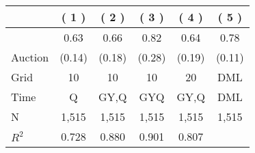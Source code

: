 
\begin{tabular}{lccccc}
\toprule
 & ( 1 ) & ( 2 ) & ( 3 ) & ( 4 ) & ( 5 )\\
\midrule
 & 0.63 & 0.66 & 0.82 & 0.64 & 0.78\\

\multirow{-2}{*}{\raggedright\arraybackslash Auction} & (0.14) & (0.18) & (0.28) & (0.19) & (0.11)\\

\midrule
Grid & 10 & 10 & 10 & 20 & DML\\

Time & Q & GY,Q & GYQ & GY,Q & DML\\

N & 1,515 & 1,515 & 1,515 & 1,515 & 1,515\\

$R^2$ & 0.728 & 0.880 & 0.901 & 0.807 & \\
\bottomrule
\end{tabular}

